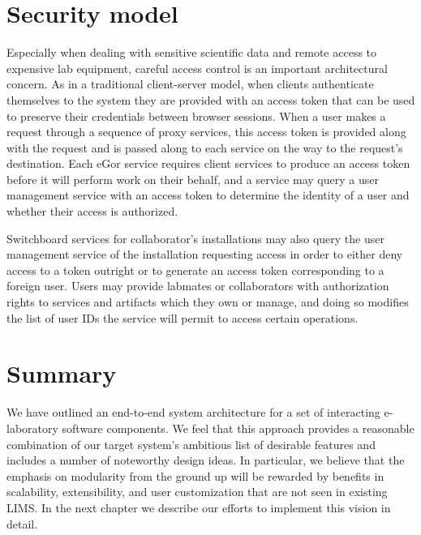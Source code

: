 \documentclass[../thesis]{subfiles}
\begin{document}
\section{Security model}
Especially when dealing with sensitive scientific data and remote
access to expensive lab equipment, careful access control is an
important architectural concern. As in a traditional client-server
model, when clients authenticate themselves to the system they are
provided with an access token that can be used to preserve their
credentials between browser sessions. When a user makes a request
through a sequence of proxy services, this access token is provided
along with the request and is passed along to each service on the way
to the request's destination. Each eGor service requires client
services to produce an access token before it will perform work on
their behalf, and a service may query a user management service with
an access token to determine the identity of a user and whether their
access is authorized.

Switchboard services for collaborator's
installations may also query the user management service of the
installation requesting access in order to either deny access to a
token outright or to generate an access token corresponding to a
foreign user.  Users may provide labmates or collaborators with
authorization rights to services and artifacts which they own or
manage, and doing so modifies the list of user IDs the service will
permit to access certain operations.



\section{Summary}
We have outlined an end-to-end system architecture for a set of
interacting e-laboratory software components. We feel that this
approach provides a reasonable combination of our target system's
ambitious list of desirable features and includes a number of
noteworthy design ideas. In particular, we believe that the emphasis
on modularity from the ground up will be rewarded by benefits in
scalability, extensibility, and user customization that are not seen
in existing \gls{LIMS}. In the next chapter we describe our efforts
to implement this vision in detail.
\end{document}
